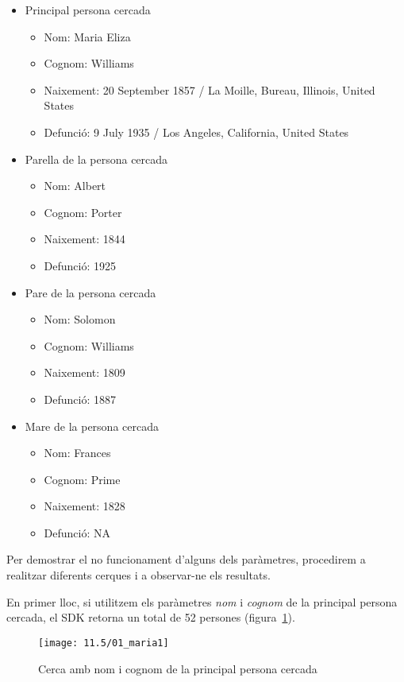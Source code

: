 \begin{itemize}
    \item Principal persona cercada
    \begin{itemize}
        \item Nom: Maria Eliza
        \item Cognom: Williams
        \item Naixement: 20 September 1857 / La Moille, Bureau, Illinois, United States
        \item Defunció: 9 July 1935 / Los Angeles, California, United States
    \end{itemize}
    \item Parella de la persona cercada
    \begin{itemize}
        \item Nom: Albert
        \item Cognom: Porter
        \item Naixement: 1844
        \item Defunció: 1925
    \end{itemize}
    \item Pare de la persona cercada
    \begin{itemize}
        \item Nom: Solomon
        \item Cognom: Williams
        \item Naixement: 1809
        \item Defunció: 1887
    \end{itemize}
    \item Mare de la persona cercada
    \begin{itemize}
        \item Nom: Frances
        \item Cognom: Prime
        \item Naixement: 1828
        \item Defunció: NA
    \end{itemize}
\end{itemize}

Per demostrar el no funcionament d'alguns dels paràmetres, procedirem a rea\-lit\-zar diferents cerques i a observar-ne els resultats.

En primer lloc, si utilitzem els paràmetres \emph{nom} i \emph{cognom} de la principal persona cercada, el SDK retorna un total de 52 persones (figura~\ref{fig:maria1}).

\begin{figure}[h]
    \texttt{[image: 11.5/01\_maria1]}
    \centering
    \caption{Cerca amb nom i cognom de la principal persona cercada}\label{fig:maria1}
\end{figure}

